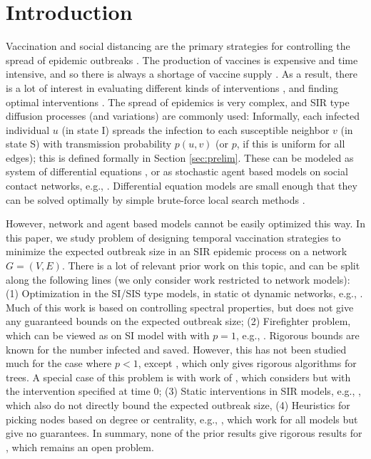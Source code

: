 \section{Introduction}
\label{sec:intro}

Vaccination and social distancing are the primary strategies for controlling the spread of epidemic outbreaks
\cite{medlock:science09,Ogura2017,halloran:pnas08,lofgren:pnas14,zhang2015controlling,YaoSDM2014,AAAI1816714,PreciadoVM13_2,PreciadoVM13,PreciadoVM14,Aspnes:2005}.
The production of vaccines is expensive and time intensive, and so there is always a shortage of
vaccine supply \cite{cdc:temporal}. As a result, there is a lot of interest in evaluating different kinds of
interventions \cite{halloran:pnas08,lofgren:pnas14}, and finding optimal interventions \cite{medlock:science09}.
The spread of epidemics is very complex, and SIR type diffusion processes (and variations) are commonly used:
Informally, each infected individual $u$ (in state I) spreads the infection to each susceptible neighbor $v$ 
(in state S) with transmission probability $p(u, v)$ (or $p$, if this is uniform for all edges); 
this is defined formally in Section \ref{sec:prelim}.
These can be modeled as system of differential equations \cite{medlock:science09,AAAI1816714,venkataramanan:ichi17}, or as stochastic
agent based models on social contact networks, e.g., \cite{marathe:cacm13}.
Differential equation models are small enough that they can be solved optimally by simple brute-force
local search methods \cite{medlock:science09}.

However, network and agent based models cannot be easily optimized this way. 
In this paper, we study problem \prob{} of designing temporal vaccination strategies to minimize
the expected outbreak size in an SIR epidemic process on a network $G=(V, E)$.
There is a lot of relevant prior work on this topic, and can be split along the following lines
(we only consider work restricted to network models):
(1) Optimization in the SI/SIS type models, in static ot dynamic networks, e.g.,
\cite{PreciadoVM13_2,PreciadoVM13,PreciadoVM14,SahaSDM15,Ogura2017}. Much of this work is based on
controlling spectral properties, but does not give any guaranteed bounds on the expected outbreak size;
(2) Firefighter problem, which can be viewed as \prob{} on SI model with with $p=1$, e.g.,
\cite{anshelevich09,Finbow2009TheFP}. Rigorous bounds are known for the number infected and saved.
However, this has not been studied much for the case where $p<1$, except \cite{DBLP:journals/corr/abs-1711-08237},
which only gives rigorous algorithms for trees.
A special case of this problem is with work of \cite{Aspnes:2005}, which considers \prob{} but with
the intervention specified at time 0;
(3) Static interventions in SIR models, e.g., \cite{zhang2015controlling,YaoSDM2014}, which also do not
directly bound the expected outbreak size,
(4) Heuristics for picking nodes based on degree or centrality, e.g., \cite{PhysRevLett.91.247901,Miller2007EffectiveVS},
which work for all models but give no guarantees.
In summary, none of the prior results give rigorous results for \prob{}, which remains an open problem.

